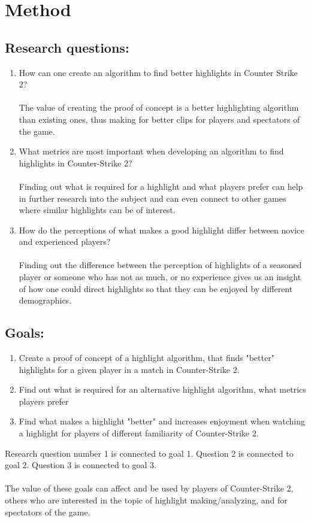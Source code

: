 
\chapter{Method}
\label{chp:method}
\section{Research questions:}
\normalsize
\begin{enumerate}[label=RQ\arabic*., leftmargin=*]
    \item How can one create an algorithm to find better highlights in Counter Strike 2? \\\\
    The value of creating the proof of concept is a better highlighting algorithm than existing ones, thus making for better clips for players and spectators of the game. 
    \item What metrics are most important when developing an algorithm to find highlights in Counter-Strike 2? \\\\
    Finding out what is required for a highlight and what players prefer can help in further research into the subject and can even connect to other games where similar highlights can be of interest.
    \item How do the perceptions of what makes a good highlight differ between novice and experienced players?\\\\
    Finding out the difference between the perception of highlights of a seasoned player or someone who has not as much, or no experience gives us an insight of how one could direct highlights so that they can be enjoyed by different demographics. 
\end{enumerate}
\section{Goals:}
\normalsize
\begin{enumerate}[label=G\arabic*., leftmargin=*]
    \item Create a proof of concept of a highlight algorithm, that finds "better" highlights for a given player in a match in Counter-Strike 2.
    \item Find out what is required for an alternative highlight algorithm, what metrics players prefer
    \item Find what makes a highlight "better" and increases enjoyment when watching a highlight for players of different familiarity of Counter-Strike 2.

\end{enumerate}
Research question number 1 is connected to goal 1. Question 2 is connected to goal 2. Question 3 is connected to goal 3.\\\\
The value of these goals can affect and be used by players of Counter-Strike 2, others who are interested in the topic of highlight making/analyzing, and for spectators of the game.\\\\

